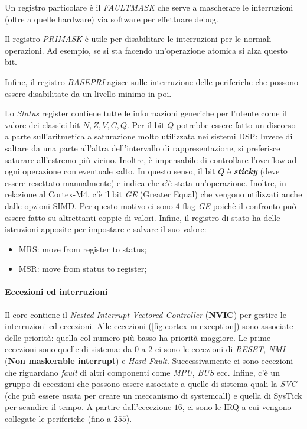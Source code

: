 \documentclass{article}
\begin{document}
Un registro particolare è il \textit{FAULTMASK} che serve a mascherare le interruzioni (oltre a quelle hardware) via software per effettuare debug.

Il registro \textit{PRIMASK} è utile per disabilitare le interruzioni per le normali operazioni. Ad esempio, se si sta facendo un'operazione atomica si alza questo bit.

Infine, il registro \textit{BASEPRI} agisce sulle interruzione delle periferiche che possono essere disabilitate da un livello minimo in poi.

Lo \textit{Status} register contiene tutte le informazioni generiche per l'utente come il valore dei classici bit $N, Z, V, C, Q$. Per il bit $Q$ potrebbe essere fatto un discorso a parte sull'aritmetica a saturazione molto utilizzata nei sistemi DSP: Invece di saltare da una parte all'altra dell'intervallo di rappresentazione, si preferisce saturare all'estremo più vicino. Inoltre, è impensabile di controllare l'overflow ad ogni operazione con eventuale salto. In questo senso, il bit $Q$ è \textbf{\textit{sticky}} (deve essere resettato manualmente) e indica che c'è stata un'operazione.
Inoltre, in relazione al Cortex-M4, c'è il bit \textit{GE} (Greater Equal) che vengono utilizzati anche dalle opzioni SIMD. Per questo motivo ci sono $4$ flag \textit{GE} poichè il confronto può essere fatto su altrettanti coppie di valori. 
Infine, il registro di stato ha delle istruzioni apposite per impostare e salvare il suo valore:
\begin{itemize}
  \item MRS: move from register to status;
  \item MSR: move from status to register;
\end{itemize}

\paragraph{Eccezioni ed interruzioni}
Il core contiene il \textit{Nested Interrupt Vectored Controller} (\textbf{NVIC}) per gestire le interruzioni ed eccezioni. Alle eccezioni (\cref{fig:cortex-m-exception}) sono associate delle priorità: quella col numero più basso ha priorità maggiore. Le prime eccezioni sono quelle di sistema: da $0$ a $2$ ci sono le eccezioni di \textit{RESET}, \textit{NMI} (\textbf{Non  maskerable interrupt}) e \textit{Hard Fault}. Successivamente ci sono eccezioni che riguardano \textit{fault} di altri componenti come \textit{MPU}, \textit{BUS} ecc. Infine, c'è un gruppo di eccezioni che possono essere associate a quelle di sistema quali la \textit{SVC} (che può essere usata per creare un meccanismo di systemcall) e quella di SysTick per scandire il tempo. A partire dall'eccezione $16$, ci sono le IRQ a cui vengono collegate le periferiche (fino a $255$).
\end{document}
